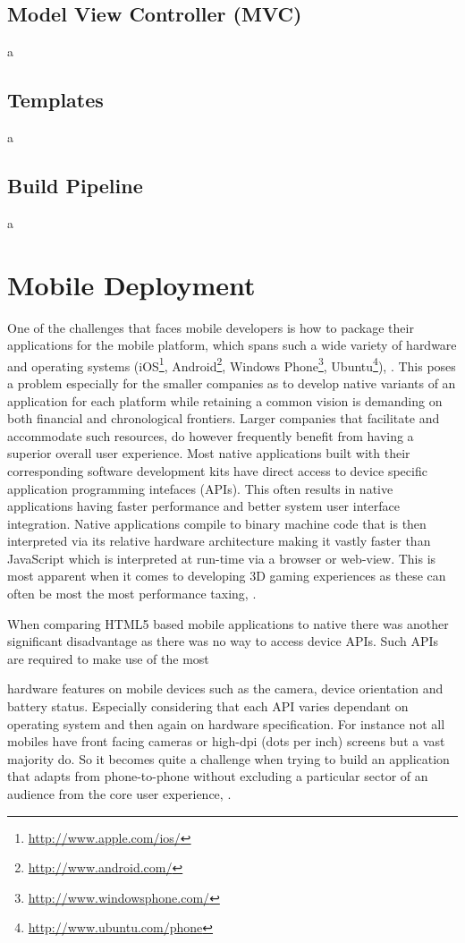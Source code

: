 \documentclass[final]{cmpreport}
\begin{document}
\subsection{Model View Controller (MVC)}
a

\subsection{Templates}
a

\subsection{Build Pipeline}
a

\section{Mobile Deployment}
One of the challenges that faces mobile developers is how to package their applications for the mobile platform, which spans such a wide variety of hardware and operating systems (iOS\footnote{\url{http://www.apple.com/ios/}}, Android\footnote{\url{http://www.android.com/}}, Windows Phone\footnote{\url{http://www.windowsphone.com/}}, Ubuntu\footnote{\url{http://www.ubuntu.com/phone}}), \cite{Feijoo}. This poses a problem especially for the smaller companies as to develop native variants of an application for each platform while retaining a common vision is demanding on both financial and chronological frontiers. Larger companies that facilitate and accommodate such resources, do however frequently benefit from having a superior overall user experience. Most native applications built with their corresponding software development kits have direct access to device specific  application programming intefaces (APIs). This often results in native applications having faster performance and better system user interface integration. Native applications compile to binary machine code that is then interpreted via its relative hardware architecture making it vastly faster than JavaScript which is interpreted at run-time via a browser or web-view. This is most apparent when it comes to developing 3D gaming experiences as these can often be most the most performance taxing, \cite{Kulloli}.

When comparing HTML5 based mobile applications to native there was another significant disadvantage as there was no way to access device APIs. Such APIs are required to make use of the most 

 hardware features on mobile devices such as the camera, device orientation and battery status. Especially considering that each API varies dependant on operating system and then again on hardware specification. For instance not all mobiles have front facing cameras or high-dpi (dots per inch) screens but a vast majority do. So it becomes quite a challenge when trying to build an application that adapts from phone-to-phone without excluding a particular sector of an audience from the core user experience, \cite{Charland}.
\end{document}
